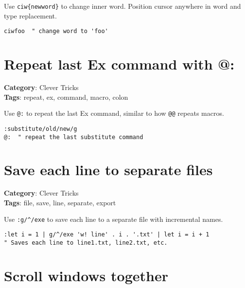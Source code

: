 {{{Use {\footnotesize \Verb§ciw{newword}§} to change inner word. Position cursor anywhere in word and type replacement.

\begin{Exa*}{}
\begin{Verbatim}[fontsize=\footnotesize, breaklines, breakanywhere]
ciwfoo  " change word to 'foo'
\end{Verbatim}
\end{Exa*}

\section{Repeat last Ex command with @:}

\textbf{Category}: Clever Tricks\\ \textbf{Tags}: repeat, ex, command, macro, colon
\vspace{0.5cm}

Use {\footnotesize \Verb§@:§} to repeat the last Ex command, similar to how {\footnotesize \Verb§@@§} repeats macros.

\begin{Exa*}{}
\begin{Verbatim}[fontsize=\footnotesize, breaklines, breakanywhere]
:substitute/old/new/g
@:  " repeat the last substitute command
\end{Verbatim}
\end{Exa*}

\section{Save each line to separate files}

\textbf{Category}: Clever Tricks\\ \textbf{Tags}: file, save, line, separate, export
\vspace{0.5cm}

Use {\footnotesize \Verb§:g/^/exe§} to save each line to a separate file with incremental names.

\begin{Exa*}{}
\begin{Verbatim}[fontsize=\footnotesize, breaklines, breakanywhere]
:let i = 1 | g/^/exe 'w! line' . i . '.txt' | let i = i + 1
" Saves each line to line1.txt, line2.txt, etc.
\end{Verbatim}
\end{Exa*}

\section{Scroll windows together}

}}}
